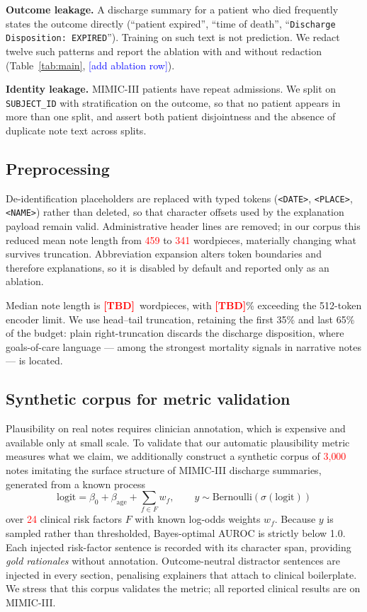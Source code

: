 \documentclass[conference]{IEEEtran}
\newif\ifdraftnums\draftnumstrue   %
\newcommand{\TBD}{\ifdraftnums\textcolor{red}{\textbf{[TBD]}}\else--\fi}
\newcommand{\ph}[1]{\ifdraftnums\textcolor{red}{#1}\else#1\fi}
\newcommand{\note}[1]{\ifdraftnums\textcolor{blue}{\small[#1]}\fi}
\begin{document}
\textbf{Outcome leakage.} A discharge summary for a patient who died frequently
states the outcome directly (``patient expired'', ``time of death'',
``\texttt{Discharge Disposition: EXPIRED}''). Training on such text is not
prediction. We redact twelve such patterns and report the ablation with and
without redaction (Table~\ref{tab:main}, \note{add ablation row}).

\textbf{Identity leakage.} MIMIC-III patients have repeat admissions. We split on
\texttt{SUBJECT\_ID} with stratification on the outcome, so that no patient
appears in more than one split, and assert both patient disjointness and the
absence of duplicate note text across splits.

\subsection{Preprocessing}
De-identification placeholders are replaced with typed tokens
(\texttt{<DATE>}, \texttt{<PLACE>}, \texttt{<NAME>}) rather than deleted, so that
character offsets used by the explanation payload remain valid. Administrative
header lines are removed; in our corpus this reduced mean note length from
\ph{459} to \ph{341} wordpieces, materially changing what survives truncation.
Abbreviation expansion alters token boundaries and therefore explanations, so it
is disabled by default and reported only as an ablation.

Median note length is \TBD\ wordpieces, with \TBD\% exceeding the 512-token
encoder limit. We use head--tail truncation, retaining the first 35\% and last
65\% of the budget: plain right-truncation discards the discharge disposition,
where goals-of-care language --- among the strongest mortality signals in
narrative notes --- is located.

\subsection{Synthetic corpus for metric validation}\label{sec:synthetic}
Plausibility on real notes requires clinician annotation, which is expensive and
available only at small scale. To validate that our automatic plausibility metric
measures what we claim, we additionally construct a synthetic corpus of
\ph{3{,}000} notes imitating the surface structure of MIMIC-III discharge
summaries, generated from a known process
\begin{equation}
\mathrm{logit} = \beta_0 + \beta_{\text{age}} + \sum_{f \in F} w_f,
\qquad y \sim \mathrm{Bernoulli}(\sigma(\mathrm{logit}))
\end{equation}
over \ph{24} clinical risk factors $F$ with known log-odds weights $w_f$. Because
$y$ is sampled rather than thresholded, Bayes-optimal AUROC is strictly below
1.0. Each injected risk-factor sentence is recorded with its character span,
providing \emph{gold rationales} without annotation. Outcome-neutral distractor
sentences are injected in every section, penalising explainers that attach to
clinical boilerplate. We stress that this corpus validates the metric; all
reported clinical results are on MIMIC-III.
\end{document}
